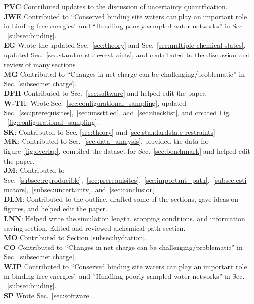 \documentclass[9pt,bestpractices]{livecoms}
\begin{document}
\textbf{PVC} Contributed updates to the discussion of uncertainty quantification.\\
\textbf{JWE} Contributed to ``Conserved binding site waters can play an important role in binding free energies'' and ``Handling poorly sampled water networks'' in Sec. ~\ref{subsec:binding}.\\
\textbf{EG} Wrote the updated Sec.~\ref{sec:theory} and Sec.~\ref{sec:multiple-chemical-states},  updated Sec.~\ref{sec:standardstate-restraints}, and contributed to the discussion and review of many sections.\\
\textbf{MG} Contributed to ``Changes in net charge can be challenging/problematic'' in Sec. \ref{subsec:net charge}. \\
\textbf{DFH} Contributed to Sec.~\ref{sec:software} and helped edit the paper. \\
\textbf{W-TH}: Wrote Sec.~\ref{sec:configurational_sampling}, updated Sec.~\ref{sec:prerequisites},~\ref{sec:unsettled}, and~\ref{sec:checklist}, and created Fig. ~\ref{fig:configurational_sampling}.\\
\textbf{SK}: Contributed to Sec. \ref{sec:theory} and \ref{sec:standardstate-restraints}  \\
\textbf{MK}: Contributed to Sec.~\ref{sec:data_analysis}, provided the data for figure~\ref{fig:overlap}, compiled the dataset for Sec.~\ref{sec:benchmark} and helped edit the paper.\\
\textbf{JM}: Contributed to Sec.~\ref{subsec:reproducible},~\ref{sec:prerequisites},~\ref{sec:important_path},~\ref{subsec:estimators},~\ref{subsec:uncertainty}, and~\ref{sec:conclusion}\\
\textbf{DLM}: Contributed to the outline, drafted some of the sections, gave ideas on figures, and helped edit the paper.\\
\textbf{LNN}: Helped write the simulation length, stopping conditions, and information saving section. Edited and reviewed alchemical path section.\\
\textbf{MO} Contributed to Section \ref{subsec:hydration}.\\
\textbf{CO} Contributed to ``Changes in net charge can be challenging/problematic'' in Sec. \ref{subsec:net charge}. \\
\textbf{WJP} Contributed to ``Conserved binding site waters can play an important role in binding free energies'' and ``Handling poorly sampled water networks'' in Sec. ~\ref{subsec:binding}.\\
\textbf{SP} Wrote Sec.~\ref{sec:software}. \\
\end{document}
